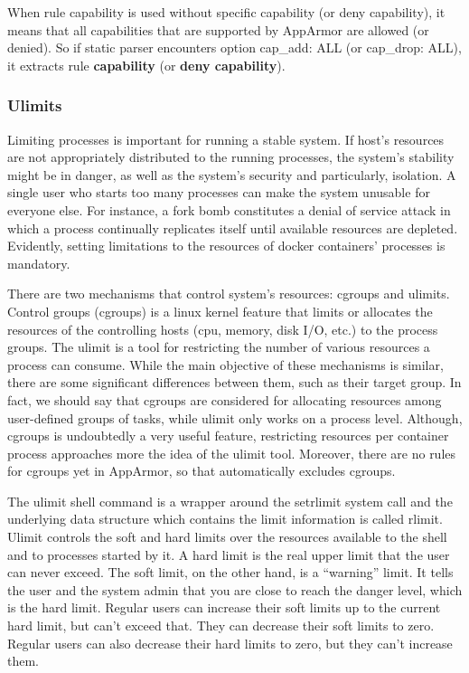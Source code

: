 When rule capability is used without specific capability (or deny capability), it means that all capabilities that are supported by AppArmor are allowed (or denied). So if static parser encounters option cap\_add: ALL (or cap\_drop: ALL), it extracts rule \textbf{capability} (or \textbf{deny capability}).

\subsubsection{Ulimits}

Limiting processes is important for running a stable system. If host's resources are not appropriately distributed to the running processes, the system's stability might be in danger, as well as the system's security and particularly, isolation. A single user who starts too many processes can make the system unusable for everyone else. For instance, a fork bomb constitutes a denial of service attack in which a process continually replicates itself until available resources are depleted. Evidently, setting limitations to the resources of docker containers' processes is mandatory.

There are two mechanisms that control system's resources: cgroups and ulimits. Control groups (cgroups) is a linux kernel feature that limits or allocates the resources of the controlling hosts (cpu, memory, disk I/O, etc.) to the process groups. The ulimit is a tool for restricting the number of various resources a process can consume. While the main objective of these mechanisms is similar, there are some significant differences between them, such as their target group. In fact, we should say that cgroups are considered for allocating resources among user-defined groups of tasks, while ulimit only works on a process level. Although, cgroups is undoubtedly a very useful feature, restricting resources per container process approaches more the idea of the ulimit tool. Moreover, there are no rules for cgroups yet in AppArmor, so that automatically excludes cgroups.

The ulimit shell command is a wrapper around the setrlimit system call and the underlying data structure which contains the limit information is called rlimit. Ulimit controls the soft and hard limits over the resources available to the shell and to processes started by it. A hard limit is the real upper limit that the user can never exceed. The soft limit, on the other hand, is a “warning” limit. It tells the user and the system admin that you are close to reach the danger level, which is the hard limit. Regular users can increase their soft limits up to the current hard limit, but can’t exceed that. They can decrease their soft limits to zero. Regular users can also decrease their hard limits to zero, but they can’t increase them.

